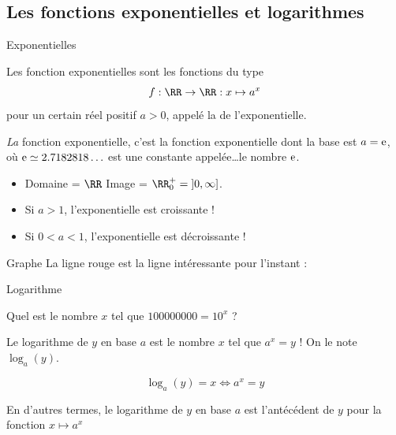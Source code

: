 \documentclass[french,xcolor=svgnames]{beamer}
\begin{document}
\subsection{Les fonctions exponentielles et logarithmes}\label{fctlog}
\begin{frame}{Exponentielles}
  \begin{definition}
    Les fonction exponentielles sont les fonctions du type\pause{}
    \begin{equation*}
      f : \RR \to \RR : x \mapsto a^x
    \end{equation*}\pause{}
    pour un certain réel positif $a > 0$, appelé la  de l'exponentielle.
  \end{definition}\pause

  \begin{definition}
    \emph{La} fonction exponentielle\pause{}, c'est la fonction exponentielle dont la base est $a = \textup{e}$, où $\textup{e} \simeq 2.7182818\ldots$ est une constante appelée\dots \og le nombre $\textup{e}$.\fg{} %
  \end{definition}\pause
  
  \begin{remark}
    \begin{itemize}
    \item Domaine = $\RR$ \qquad Image = $\RR_0^+ = \mathopen]0,\infty\mathclose]$.\pause{}
    \item Si \(a > 1\), l'exponentielle est croissante !\pause{}
    \item Si \(0 < a < 1\), l'exponentielle est décroissante !
    \end{itemize}
  \end{remark}
\end{frame}

\begin{frame}{Graphe}
  La ligne rouge est la ligne intéressante pour l'instant :\pause{}
  \begin{center}
  \end{center}
\end{frame}

\begin{frame}{Logarithme}
  \begin{question}
    Quel est le nombre \(x\) tel que \(100000000 = 10^x\) ?
  \end{question}\pause
  \begin{definition}
    Le logarithme de \(y\) en base \(a\) est le nombre \(x\) tel que \(a^{x} = y\) ! On le note \(\log_{a}(y)\).
  \end{definition}
  \pause
  \begin{equation*}
    \log_a (y) = x \iff a^{x} = y
  \end{equation*}
  \pause
  \begin{remark*}
    En d'autres termes, le logarithme de \(y\) en base \(a\) est l'antécédent de \(y\) pour la fonction \(x\mapsto a^{x}\)
  \end{remark*}
\end{frame}
\end{document}
